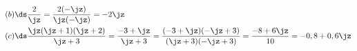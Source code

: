 \begin{align}
  (b) & \ds \frac{2}{\jz} = \frac{2 (-\jz)}{\jz (-\jz)} = - 2 \jz
  \label{test:la{b}el}
\\
(c) & \ds \frac{\jz (\jz+1) (\jz+2)}{\jz+3} = \frac{-3 + \jz}{\jz +3}
 = \frac{(-3+\jz)(-\jz+3)}{(\jz+3)(-\jz+3)} = \frac{-8+6\jz}{10} = -0,8
 + 0,6 \jz
\end{align}
